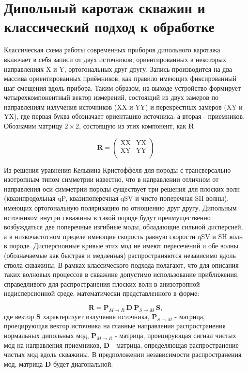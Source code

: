 \documentclass[a4paper,11pt]{article}
\begin{document}
\section{Дипольный каротаж скважин и классический подход к обработке}
Классическая схема работы современных приборов дипольного каротажа включает в себя записи от двух источников, ориентированных в некоторых направлениях X и Y, ортогональных друг другу. Запись производится на два массива ориентированных приёмников, как правило имеющих фиксированный шаг смещения вдоль прибора. Таким образом, на выходе устройство формирует четырехкомпонентный вектор измерений, состоящий из двух замеров по направлениям излучения источников (XX и YY) и перекрёстных замеров (XY и YX), где первая буква обозначает ориентацию источника, а вторая - приемников. Обозначим матрицу $2 \times 2$, состоящую из этих компонент, как $\mathbf{R}$ 

$$
	\mathbf{R} = \left(
	\begin{array}{cc}
	\text{XX} & \text{YX} \\
	\text{XY} & \text{YY} \\
	\end{array}
	\right) 
$$

Из решения уравнения Кельвина-Кристоффеля для породы с трансверсально-изотропным типом симметрии известно, что в направлении отличном от направления оси симметрии породы существует три решения для плоских волн (квазипродольная qP, квазипоперечная qSV и чисто поперечная SH волны), имеющих ортогональную поляризацию по отношению друг другу. Дипольным источником внутри скважины в такой породе будут преимущественно возбуждаться две поперечные изгибные моды, обладающие сильной дисперсией, а в низкочастотном пределе имеющие скорость равную скорости qSV и SH волн в породе. Дисперсионные кривые этих мод не имеют пересечений и обе волны (обозначаемые как быстрая и медленная) распространяются независимо вдоль ствола скважины. В рамках классического подхода полагают, что для описания таких волновых процессов в скважине допустимо использование приближения, справедливого для распространения плоских волн в анизотропной недисперсионной среде, математически представленного в форме:

$$
	\mathbf{R} = \mathbf{P}_{M \rightarrow R} \ \mathbf{D} \ \mathbf{P}_{S \rightarrow M} \ \mathbf{S},
$$
где вектор $\mathbf{S}$ характеризует излучение источника, $\mathbf{P}_{S \rightarrow M}$ - матрица, проецирующая вектор источника на главные направления распространения нормальных дипольных мод, $\mathbf{P}_{M \rightarrow R}$ - матрица, проецирующая сигнал чистых мод на направления приемников, $\mathbf{D}$ - матрица, определяющая распространение чистых мод вдоль скважины. В предположении независимости распространения мод, матрица $\mathbf{D}$ будет диагональной. 
\end{document}
